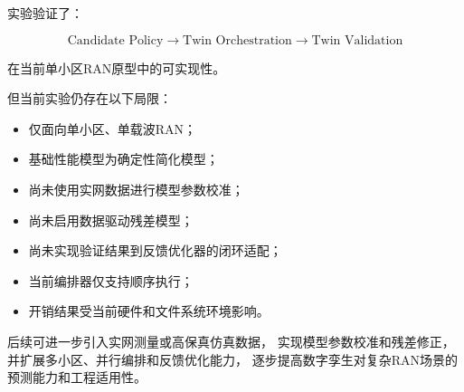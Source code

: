 \documentclass[lang=cn,12pt]{elegantbook}
\begin{document}
实验验证了：

\begin{equation}
\boxed{
\text{Candidate Policy}
\rightarrow
\text{Twin Orchestration}
\rightarrow
\text{Twin Validation}
}
\end{equation}

在当前单小区RAN原型中的可实现性。

但当前实验仍存在以下局限：

\begin{itemize}
    \item 仅面向单小区、单载波RAN；
    \item 基础性能模型为确定性简化模型；
    \item 尚未使用实网数据进行模型参数校准；
    \item 尚未启用数据驱动残差模型；
    \item 尚未实现验证结果到反馈优化器的闭环适配；
    \item 当前编排器仅支持顺序执行；
    \item 开销结果受当前硬件和文件系统环境影响。
\end{itemize}

后续可进一步引入实网测量或高保真仿真数据，
实现模型参数校准和残差修正，
并扩展多小区、并行编排和反馈优化能力，
逐步提高数字孪生对复杂RAN场景的预测能力和工程适用性。

\printbibliography
\end{document}
